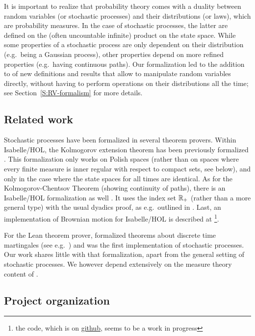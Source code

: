 \documentclass[lean]{Draft}
\begin{document}
It is important to realize that probability theory comes with a duality between random variables (or stochastic processes) and their distributions (or laws), which are probability measures. In the case of stochastic processes, the latter are defined on the (often uncountable infinite) product on the state space. While some properties of a stochastic process are only dependent on their distribution (e.g.\ being a Gaussian process), other properties depend on more refined properties (e.g.\ having continuous paths).
Our formalization led to the addition to \mathlib of new definitions and results that allow to manipulate random variables directly, without having to perform operations on their distributions all the time; see Section~\ref{S:RV-formalism} for more details.

\subsection{Related work}
Stochastic processes have been formalized in several theorem provers.
Within Isabelle/HOL, the Kolmogorov extension theorem has been previously formalized \cite{Immler2012}. This formalization only works on Polish spaces (rather than on spaces where every finite measure is inner regular with respect to compact sets, see below), and only in the case where the state spaces for all times are identical. As for the Kolmogorov-Chentsov Theorem (showing continuity of paths), there is an Isabelle/HOL formalization as well \cite{Kolmogorov_Chentsov-AFP}.
It uses the index set  $\mathbb{R}_+$ (rather than a more general type) with the usual dyadics proof, as e.g.\ outlined in \cite{kallenberg2021}. Last, an implementation of
Brownian motion for Isabelle/HOL is described at \cite{laursen2024brownian} \footnote{the code, which is on \href{https://github.com/cplaursen/Brownian_Motion}{github}, seems to be a work in progress}.

For the Lean theorem prover, \cite{ying2023formalization} formalized theorems about discrete time martingales (see e.g.\ \cite{kallenberg2021}) and was the first implementation of stochastic processes.
Our work shares little with that formalization, apart from the general setting of stochastic processes. We however depend extensively on the measure theory content of \cite{mathlib}.


\subsection{Project organization}
\end{document}
